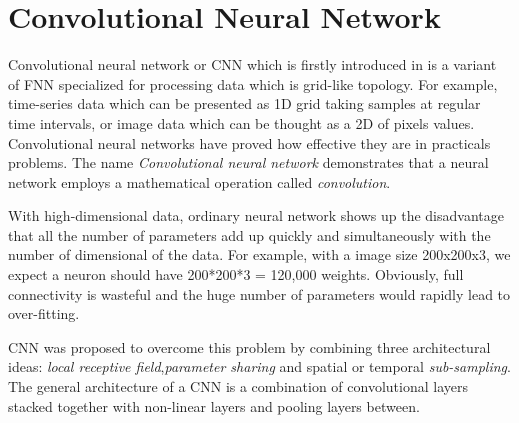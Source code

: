 \section{Convolutional Neural Network}
\hspace{0.45cm}
Convolutional neural network or \acrshort{CNN} which is firstly introduced in \cite{cnn} is a variant of FNN specialized 
for processing data which is grid-like topology\cite{Goodfellow-et-al-2016}. For example, time-series data which can be presented as 1D grid 
taking samples at regular time intervals, or image data which can be thought as a 2D of pixels values. Convolutional neural networks have proved how effective they are in practicals problems. 
The name \textit{Convolutional neural network} demonstrates that a neural network employs a mathematical operation called 
\textit{convolution}.\par
With high-dimensional data, ordinary neural network shows up the disadvantage that all the number of parameters 
add up quickly and simultaneously with the number of dimensional of the data\cite{cs231n}. 
For example, with a image size 200x200x3, we expect a neuron should have 200*200*3 = 120,000 weights. 
Obviously, full connectivity is wasteful and the huge number of parameters would rapidly lead to over-fitting.\par
CNN was proposed to overcome this problem by combining three architectural ideas: 
\textit{local receptive field},\textit{parameter sharing} and spatial or temporal \textit{sub-sampling}. 
The general architecture of a \acrshort{CNN} is a combination of convolutional layers stacked 
together with non-linear layers and pooling layers between.
